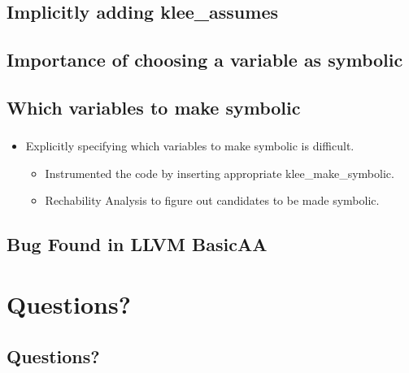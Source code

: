 \documentclass[mathserif,10pt]{beamer}
\newcommand{\cmt}[1]{}
\begin{document}
\subsection{Implicitly adding klee\_assumes}
\frame
{
  \frametitle{\subsecname}
  \lstII
    \cmt{
    Without the klee_assume, the dereference z->x may get resolved to many
      spurious memory objects. But while dealing with pointer analysis results
      we assume that the index of gptr is within bounds and as a result we are
      getting false positives that (The set of allocation sites corresponding
          to the memory object of the load address, z->x) is NOT a subset of
      (Points to allocation sites for the load address z->x) 
    }

}

\subsection{Importance of choosing a variable as symbolic}
\frame
{
  \frametitle{\subsecname}
  \lstI

}

\subsection{Which variables to make symbolic}
\frame
{
  \frametitle{\subsecname}
  \begin{itemize}
    \item Explicitly specifying which variables to make symbolic is difficult. 
    \vspace{1cm}
    \begin{itemize}
      \item Instrumented the code by inserting appropriate klee\_make\_symbolic.
      \item Rechability Analysis to figure out candidates to be made symbolic.
    \end{itemize}
  \end{itemize}
  \cmt{
    Rather that explicitly making the  inputs of the test program
      symbolic, let klee instrument the code by inserting klee_make_symbolic
      calls. The inputs that we are considering include command line arguments,
      file inputs, globals and variables used to read inputs (for example using
          scanf).
  }
}


\subsection{Bug Found in LLVM BasicAA}
\frame
{
  \frametitle{\subsecname}
  \lstIII
}

\section{Questions?}
\subsection{Questions?}
\frame
{}
\end{document}
